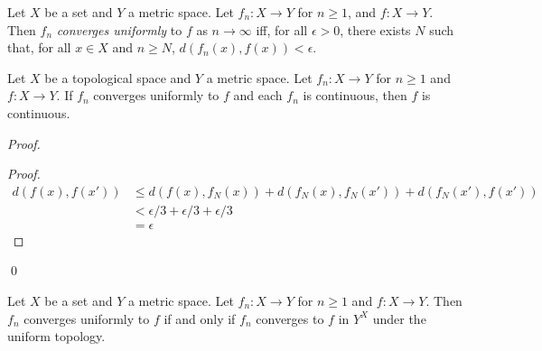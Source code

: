 \begin{df}
  Let $X$ be a set and $Y$ a metric space. Let $f_n : X \rightarrow Y$ for $n
  \geq 1$, and $f : X \rightarrow Y$. Then $f_n$ \emph{converges uniformly}
  to
  $f$ as $n \rightarrow \infty$ iff, for all $\epsilon > 0$, there exists $N$
  such that, for all $x \in X$ and $n \geq N$, $d(f_n(x), f(x)) < \epsilon$.
\end{df}

\begin{thm}
  Let $X$ be a topological space and $Y$ a metric space. Let $f_n : X
  \rightarrow Y$ for $n \geq 1$ and $f : X \rightarrow Y$. If $f_n$ converges
  uniformly to $f$ and each $f_n$ is continuous, then $f$ is continuous.
\end{thm}

\begin{proof}
  \pf
  \begin{proof}
    \pf
    \begin{align*}
      d(f(x), f(x')) & \leq d(f(x), f_N(x)) + d(f_N(x), f_N(x')) + d(f_N(x'),
      f(x')) \\
      & < \epsilon / 3 + \epsilon / 3 + \epsilon / 3 \\
      & = \epsilon
    \end{align*}
  \end{proof}
  \qed
\end{proof}

\begin{lm}
  \label{lm:topology:metric:convergence:uniform}
  Let $X$ be a set and $Y$ a metric space. Let $f_n : X \rightarrow Y$ for $n \geq 1$ and
  $f : X \rightarrow Y$. Then $f_n$ converges uniformly to $f$ if
  and only if $f_n$ converges to $f$ in $Y^X$ under the uniform
  topology.
\end{lm}

